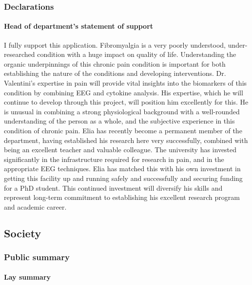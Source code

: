 \documentclass[twocolumn, serif, rga, numeric]{jote-article}
\begin{document}
\subsubsection*{Declarations}



\noindent\paragraph{\noindent Head of department's statement of support}


I fully support this application. Fibromyalgia is a very poorly
understood, under-researched condition with a huge impact on quality of
life. Understanding the organic underpinnings of this chronic pain
condition is important for both establishing the nature of the
conditions and developing interventions. Dr. Valentini's expertise in
pain will provide vital insights into the biomarkers of this condition
by combining EEG and cytokine analysis. His expertise, which he will
continue to develop through this project, will position him excellently
for this. He is unusual in combining a strong physiological background
with a well-rounded understanding of the person as a whole, and the
subjective experience in this condition of chronic pain. Elia has
recently become a permanent member of the department, having established
his research here very successfully, combined with being an excellent
teacher and valuable colleague. The university has invested
significantly in the infrastructure required for research in pain, and
in the appropriate EEG techniques. Elia has matched this with his own
investment in getting this facility up and running safely and
successfully and securing funding for a PhD student. This continued
investment will diversify his skills and represent long-term commitment
to establishing his excellent research program and academic career.


\subsection*{Society}



\subsubsection*{Public summary}



\noindent\paragraph{\noindent Lay summary}
\end{document}
